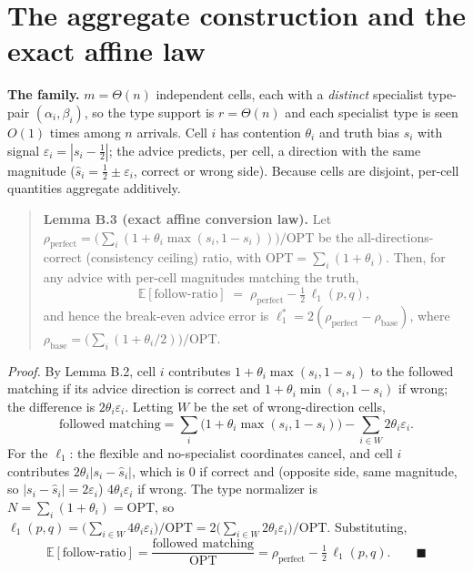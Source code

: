 \section{The aggregate construction and the exact affine
law}

\textbf{The family.} \(m=\Theta(n)\) independent cells, each with a
\emph{distinct} specialist type-pair \((\alpha_i,\beta_i)\), so the type
support is \(r=\Theta(n)\) and each specialist type is seen \(O(1)\)
times among \(n\) arrivals. Cell \(i\) has contention \(\theta_i\) and
truth bias \(s_i\) with signal \(\varepsilon_i=|s_i-\tfrac12|\); the
advice predicts, per cell, a direction with the same magnitude
(\(\hat s_i=\tfrac12\pm\varepsilon_i\), correct or wrong side). Because
cells are disjoint, per-cell quantities aggregate additively.

\begin{quote}
\textbf{Lemma B.3 (exact affine conversion law).} Let
\(\rho_{\mathrm{perfect}}=\bigl(\sum_i(1+\theta_i\max(s_i,1-s_i))\bigr)/\mathrm{OPT}\)
be the all-directions-correct (consistency ceiling) ratio, with
\(\mathrm{OPT}=\sum_i(1+\theta_i)\). Then, for any advice with per-cell
magnitudes matching the truth,
\[\mathbb E[\text{follow-ratio}] \;=\; \rho_{\mathrm{perfect}}-\tfrac12\,\ell_1(p,q),\]
and hence the break-even advice error is
\(\ell_1^* = 2(\rho_{\mathrm{perfect}}-\rho_{\mathrm{base}})\), where
\(\rho_{\mathrm{base}}=\bigl(\sum_i(1+\theta_i/2)\bigr)/\mathrm{OPT}\).
\end{quote}

\emph{Proof.} By Lemma B.2, cell \(i\) contributes
\(1+\theta_i\max(s_i,1-s_i)\) to the followed matching if its advice
direction is correct and \(1+\theta_i\min(s_i,1-s_i)\) if wrong; the
difference is \(2\theta_i\varepsilon_i\). Letting \(W\) be the set of
wrong-direction cells, \[\text{followed matching}
= \sum_i\bigl(1+\theta_i\max(s_i,1-s_i)\bigr)-\sum_{i\in W}2\theta_i\varepsilon_i.\]
For the \(\ell_1\): the flexible and no-specialist coordinates cancel,
and cell \(i\) contributes \(2\theta_i|s_i-\hat s_i|\), which is \(0\)
if correct and (opposite side, same magnitude, so
\(|s_i-\hat s_i|=2\varepsilon_i\)) \(4\theta_i\varepsilon_i\) if wrong.
The type normalizer is \(N=\sum_i(1+\theta_i)=\mathrm{OPT}\), so
\(\ell_1(p,q)=\bigl(\sum_{i\in W}4\theta_i\varepsilon_i\bigr)/\mathrm{OPT}
=2\bigl(\sum_{i\in W}2\theta_i\varepsilon_i\bigr)/\mathrm{OPT}\).
Substituting, \[\mathbb E[\text{follow-ratio}]
=\frac{\text{followed matching}}{\mathrm{OPT}}
=\rho_{\mathrm{perfect}}-\tfrac12\,\ell_1(p,q). \qquad\blacksquare\]

